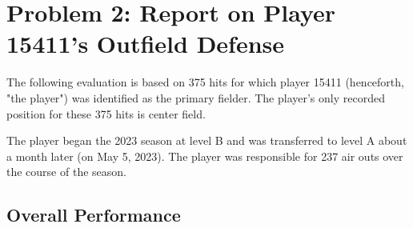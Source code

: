 
\section*{Problem 2: Report on Player 15411's Outfield Defense}
\label{sec:expts}

The following evaluation is based on 375 hits for which player 15411 (henceforth, "the player") was identified as the primary fielder. The player's only recorded position for these 375 hits is center field.

The player began the 2023 season at level B and was transferred to level A about a month later (on May 5, 2023). The player was responsible for 237 air outs over the course of the season.

\subsection{Overall Performance}
\label{sec:overallperformance}
